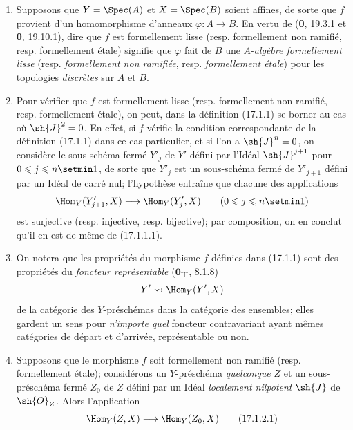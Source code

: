 \begin{remarks}[17.1.2]
\label{IV.17.1.2}
\begin{enumerate}
  \item[(i)] Supposons que $Y=\Spec(A)$ et $X=\Spec(B)$ soient affines, de sorte que $f$ provient d'un homomorphisme d'anneaux $\varphi:A\to B$. En vertu de (\textbf{0}, 19.3.1 et \textbf{0}, 19.10.1), dire que $f$ est formellement lisse (resp. formellement non ramifié, resp. formellement étale) signifie que $\varphi$ fait de $B$ une $A$-\emph{algèbre formellement lisse} (resp. \emph{formellement non ramifiée}, resp. \emph{formellement étale}) pour les topologies \emph{discrètes} sur $A$ et $B$.
  \item[(ii)] Pour vérifier que $f$ est formellement lisse (resp. formellement non ramifié, resp. formellement étale), on peut, dans la définition (17.1.1) se borner au cas où $\sh{J}^2=0$. En effet, si $f$ vérifie la condition correspondante de la définition (17.1.1) dans ce cas particulier, et si l'on a $\sh{J}^n=0$, on considère le sous-schéma fermé $Y'_j$ de $Y'$ défini par l'Idéal $\sh{J}^{j+1}$ pour $0\leq j\leq n\setmin 1$, de sorte que $Y'_j$ est un sous-schéma fermé de $Y'_{j+1}$ défini par un Idéal de carré nul; l'hypothèse entraîne que chacune des applications
  \[
    \Hom_Y(Y'_{j+1},X)\longrightarrow\Hom_Y(Y'_j,X)\qquad(0\leq j\leq n\setmin 1)
  \]
  est surjective (resp. injective, resp. bijective); par composition, on en conclut qu'il en est de même de (17.1.1.1).
  \item[(iii)] On notera que les propriétés du morphisme $f$ définies dans (17.1.1) sont des propriétés du \emph{foncteur représentable} ($\mathbf{0}_{\mathrm{III}}$, 8.1.8)
  \[
    Y'\leadsto\Hom_Y(Y',X)
  \]
  de la catégorie des $Y$-préschémas dans la catégorie des ensembles; elles gardent un sens pour \emph{n'importe quel} foncteur contravariant ayant mêmes catégories de départ et d'arrivée, représentable ou non.
  \item[(iv)] Supposons que le morphisme $f$ soit formellement non ramifié (resp. formellement étale); considérons un $Y$-préschéma \emph{quelconque} $Z$ et un sous-préschéma fermé $Z_0$ de $Z$ défini par un Idéal \emph{localement nilpotent} $\sh{J}$ de $\sh{O}_Z$. Alors l'application
  \[
  \label{IV.17.1.2.1}
    \Hom_Y(Z,X)\longrightarrow\Hom_Y(Z_0,X)
    \tag{17.1.2.1}
  \]

\end{enumerate}
\end{remarks}
